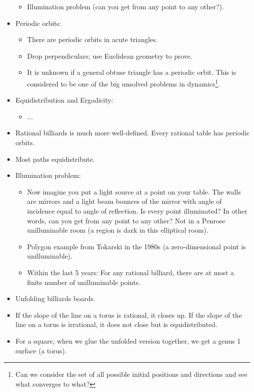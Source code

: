 \documentclass[../main.tex]{subfiles}
\begin{document}
\begin{itemize}
\begin{itemize}
        \item Illumination problem (can you get from any point to any other?).
    \end{itemize}
    \item Periodic orbits:
    \begin{itemize}
        \item There are periodic orbits in acute triangles.
        \item Drop perpendiculars; use Euclidean geometry to prove.
        \item It is unknown if a general obtuse triangle has a periodic orbit. This is considered to be one of the big unsolved problems in dynamics\footnote{Can we consider the set of all possible initial positions and directions and see what converges to what?}.
    \end{itemize}
    \item Equidistribution and Ergodicity:
    \begin{itemize}
        \item ...
    \end{itemize}
    \item Rational billiards is much more well-defined. Every rational table has periodic orbits.
    \item Most paths equidistribute.
    \item Illumination problem:
    \begin{itemize}
        \item Now imagine you put a light source at a point on your table. The walls are mirrors and a light beam bounces of the mirror with angle of incidence equal to angle of reflection. Is every point illuminated? In other words, can you get from any point to any other? Not in a Penrose unilluminable room (a region is dark in this elliptical room).
        \item Polygon example from Tokarski in the 1980s (a zero-dimensional point is unilluminable).
        \item Within the last 5 years: For any rational billiard, there are at most a finite number of unilluminable points.
    \end{itemize}
    \item Unfolding billiards boards.
    \item If the slope of the line on a torus is rational, it closes up. If the slope of the line on a torus is irrational, it does not close but is equidistributed.
    \item For a square, when we glue the unfolded version together, we get a genus 1 surface (a torus).

\end{itemize}
\end{document}
